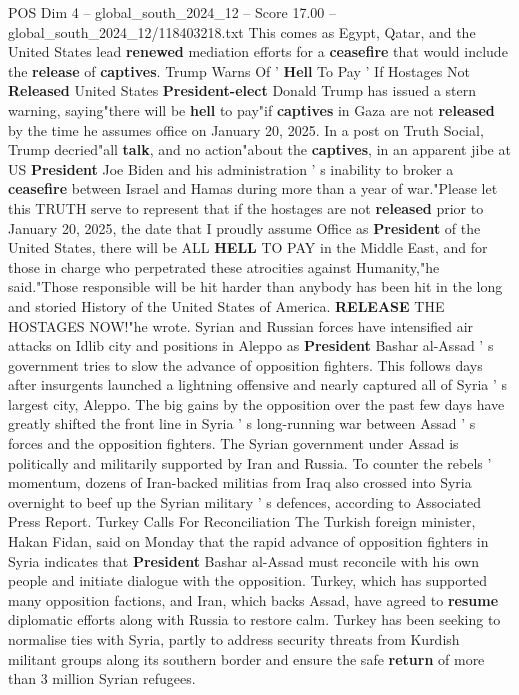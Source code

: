 \begin{textsample}{POS Dim 4 – global\_south\_2024\_12 – Score 17.00 – global\_south\_2024\_12/118403218.txt}
This comes as Egypt, Qatar, and the United States lead \textbf{renewed} mediation efforts for a \textbf{ceasefire} that would include the \textbf{release} of \textbf{captives}.
Trump Warns Of ' \textbf{Hell} To Pay ' If Hostages Not \textbf{Released} United States \textbf{President-elect} Donald Trump has issued a stern warning, saying"there will be \textbf{hell} to pay"if \textbf{captives} in Gaza are not \textbf{released} by the time he assumes office on January 20, 2025.
In a post on Truth Social, Trump decried"all \textbf{talk}, and no action"about the \textbf{captives}, in an apparent jibe at US \textbf{President} Joe Biden and his administration ' s inability to broker a \textbf{ceasefire} between Israel and Hamas during more than a year of war."Please let this TRUTH serve to represent that if the hostages are not \textbf{released} prior to January 20, 2025, the date that I proudly assume Office as \textbf{President} of the United States, there will be ALL \textbf{HELL} TO PAY in the Middle East, and for those in charge who perpetrated these atrocities against Humanity,"he said."Those responsible will be hit harder than anybody has been hit in the long and storied History of the United States of America. \textbf{RELEASE} THE HOSTAGES NOW!"he wrote.
Syrian and Russian forces have intensified air attacks on Idlib city and positions in Aleppo as \textbf{President} Bashar al-Assad ' s government tries to slow the advance of opposition fighters.
This follows days after insurgents launched a lightning offensive and nearly captured all of Syria ' s largest city, Aleppo.
The big gains by the opposition over the past few days have greatly shifted the front line in Syria ' s long-running war between Assad ' s forces and the opposition fighters.
The Syrian government under Assad is politically and militarily supported by Iran and Russia.
To counter the rebels ' momentum, dozens of Iran-backed militias from Iraq also crossed into Syria overnight to beef up the Syrian military ' s defences, according to Associated Press Report.
Turkey Calls For Reconciliation The Turkish foreign minister, Hakan Fidan, said on Monday that the rapid advance of opposition fighters in Syria indicates that \textbf{President} Bashar al-Assad must reconcile with his own people and initiate dialogue with the opposition.
Turkey, which has supported many opposition factions, and Iran, which backs Assad, have agreed to \textbf{resume} diplomatic efforts along with Russia to restore calm.
Turkey has been seeking to normalise ties with Syria, partly to address security threats from Kurdish militant groups along its southern border and ensure the safe \textbf{return} of more than 3 million Syrian refugees.

\end{textsample}

